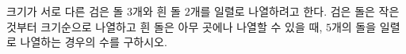 \hspace*{2mm}\begin{minipage}[t]{\dimexpr\linewidth-2mm\relax}\vspace{0pt}
크기가 서로 다른 검은 돌 $3$개와 흰 돌 $2$개를 일렬로 나열하려고 한다. 검은 돌은 작은 것부터 크기순으로 나열하고 흰 돌은 아무 곳에나 나열할 수 있을 때, $5$개의 돌을 일렬로 나열하는 경우의 수를 구하시오.\end{minipage}
